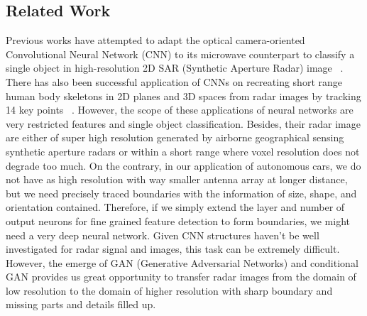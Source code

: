\subsection{Related Work}
Previous works have attempted to adapt the optical camera-oriented Convolutional Neural Network (CNN) to its microwave counterpart to classify a single object in high-resolution 2D SAR (Synthetic Aperture Radar) image ~\cite{SAR_DL, ship_SAR, change_SAR}. There has also been successful application of CNNs on recreating  short range human body skeletons in 2D planes and 3D spaces from radar images by tracking 14 key points ~\cite{rfpose, rfpose3D}. However, the scope of these applications of neural networks are very restricted features and single object classification. Besides, their radar image are either of super high resolution generated by airborne geographical sensing synthetic aperture radars or within a short range where voxel resolution does not degrade too much. On the contrary, in our application of autonomous cars, we do not have as high resolution with way smaller antenna array at longer distance, but we need precisely traced boundaries with the information of size, shape, and orientation contained. Therefore, if we simply extend the layer and number of output neurons for fine grained feature detection to form boundaries, we might need a very deep neural network. Given CNN structures haven't be well investigated for radar signal and images, this task can be extremely difficult. However, the emerge of GAN (Generative Adversarial Networks) and conditional GAN provides us great opportunity to transfer radar images from the domain of low resolution to the domain of higher resolution with sharp boundary and missing parts and details filled up. 

